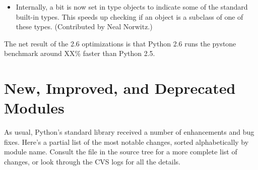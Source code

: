 \documentclass{howto}
\begin{document}
\begin{itemize}

\item Internally, a bit is now set in type objects to indicate some of
the standard built-in types.  This speeds up checking if an object is
a subclass of one of these types.  (Contributed by Neal Norwitz.)

\end{itemize}

The net result of the 2.6 optimizations is that Python 2.6 runs the
pystone benchmark around XX\% faster than Python 2.5.


\section{New, Improved, and Deprecated Modules}

As usual, Python's standard library received a number of enhancements and
bug fixes.  Here's a partial list of the most notable changes, sorted
alphabetically by module name. Consult the
 file in the source tree for a more
complete list of changes, or look through the CVS logs for all the
details.
\end{document}

